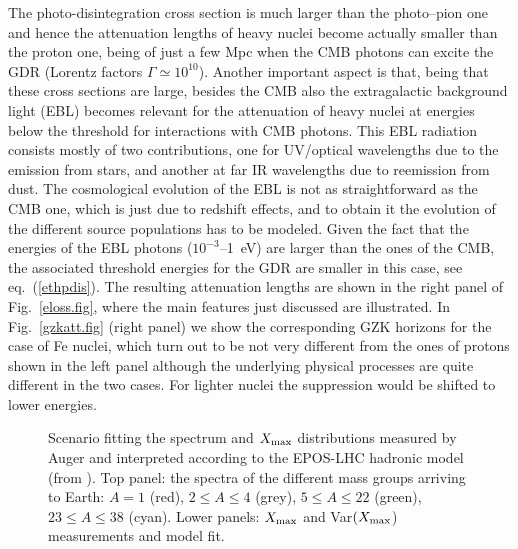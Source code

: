 \documentclass[twoside,12pt]{article}
\begin{document}
The photo-disintegration cross section is much larger than the photo--pion one and hence the attenuation lengths of heavy nuclei become actually smaller than the proton one, being of just a few Mpc when the CMB photons can excite the GDR (Lorentz factors $\Gamma\simeq 10^{10}$). Another important aspect is that, being that these cross sections are large, besides the CMB also the extragalactic background light (EBL) becomes relevant for the attenuation of heavy nuclei at energies below the threshold for interactions with CMB photons. This EBL radiation consists mostly of two contributions, one for UV/optical wavelengths due to the emission from stars, and another at far IR wavelengths due to reemission from dust. The cosmological evolution of the EBL is not as straightforward as the CMB one, which is just due to redshift effects, and to obtain it the evolution of the different source populations has to be modeled. Given the fact that the energies of the EBL photons ($10^{-3}$--1~eV) are larger than the ones of the CMB, the associated threshold energies for the GDR are smaller in this case, see eq.~(\ref{ethpdis}). The resulting attenuation lengths are shown in the right panel of Fig.~\ref{eloss.fig}, where the main features just discussed are illustrated.  In Fig.~\ref{gzkatt.fig} (right panel) we show the corresponding GZK horizons for the case of Fe nuclei, which turn out to be  not very different from the ones of protons shown in the left panel although the underlying physical processes are quite different in the two cases. For lighter nuclei the suppression would be shifted to lower energies. 

\begin{figure}[tb]
\begin{center}
\begin{minipage}[t]{8 cm}
\centerline{}\end{minipage}
\begin{minipage}[t]{16 cm}
\centerline{}
\end{minipage}
\caption{Scenario fitting the spectrum and $X_{\rm max}$ distributions measured by  Auger and interpreted according to the EPOS-LHC hadronic model (from \cite{combfit}). Top panel: the spectra of the different mass groups arriving to Earth: $A = 1$ (red), $2 \leq A \leq 4$ (grey), $5\leq A \leq 22$ (green), $23\leq A \leq 38$ (cyan). Lower panels: $X_{\rm max}$ and Var$(X_{\rm max}$) measurements and model fit. \label{combfit.fig}}
\end{center}
\end{figure}
\end{document}
